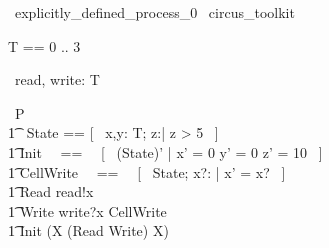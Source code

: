 % 
\begin{zsection}
  \SECTION\ explicitly\_defined\_process\_0 \parents\ circus\_toolkit
\end{zsection}

\begin{zed}
	T == 0 .. 3 
\end{zed}

\begin{circus}
	\circchannel\ read, write: T \\
\end{circus}

\begin{circus}
    \circprocess\ P \circdef \circbegin \\
        \t1 \circstate\ State == [~ x,y: T; z:\nat | z > 5 ~] \\
        \t1 Init ~~==~~ [~ (State)' | x' = 0 \land y' = 0 \land z' = 10 ~] \\
        \t1 CellWrite ~~==~~ [~ \Delta State; x?: \nat | x' = x? ~] \\
        \t1 Read \circdef read!x \then \Skip \\
        \t1 Write \circdef write?x \then \lschexpract CellWrite \rschexpract \\
        \t1 \circspot \lschexpract Init \rschexpract \circseq (\circmu X \circspot (Read \extchoice Write) \circseq X) \\ 
	\circend
\end{circus}

